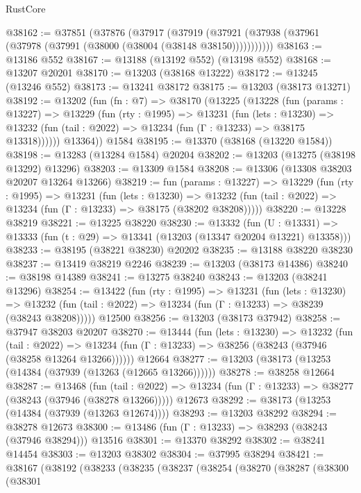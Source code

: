 \begin{lexlean}{RustCore}
\begin{coremodule}
@38162 := @37851
    (@37876
      (@37917
        (@37919 (@37921 (@37938 (@37961 (@37978 (@37991 (@38000 (@38004 (@38148 @38150)))))))))))
@38163 := @13186 @552
@38167 := @13188 (@13192 @552) (@13198 @552)
@38168 := @13207 @20201
@38170 := @13203 (@38168 @13222)
@38172 := @13245 (@13246 @552)
@38173 := @13241 @38172
@38175 := @13203 (@38173 @13271)
@38192 := @13202
    (fun (fn : @7) =>
    @38170
      (@13225
        (@13228
          (fun (params : @13227) =>
          @13229
            (fun (rty : @1995) =>
            @13231
              (fun (lets : @13230) =>
              @13232 (fun (tail : @2022) => @13234 (fun (Γ : @13233) => @38175 @13318))))))
        @13364))
    @1584
@38195 := @13370 (@38168 (@13220 @1584))
@38198 := @13283 (@13284 @1584) @20204
@38202 := @13203 (@13275 (@38198 @13292) @13296)
@38203 := @13309 @1584
@38208 := @13306 (@13308 @38203 @20207 @13264 @13266)
@38219 := fun (params : @13227) =>
  @13229
    (fun (rty : @1995) =>
    @13231
      (fun (lets : @13230) =>
      @13232 (fun (tail : @2022) => @13234 (fun (Γ : @13233) => @38175 (@38202 @38208)))))
@38220 := @13228 @38219
@38221 := @13225 @38220
@38230 := @13332
    (fun (U : @13331) => @13333 (fun (t : @29) => @13341 (@13203 (@13347 @20204 @13221) @13358)))
@38233 := @38195 (@38221 @38230) @20202
@38235 := @13188 @38220 @38230
@38237 := @13419 @38219 @2246
@38239 := @13203 (@38173 @14386)
@38240 := @38198 @14389
@38241 := @13275 @38240
@38243 := @13203 (@38241 @13296)
@38254 := @13422
    (fun (rty : @1995) =>
    @13231
      (fun (lets : @13230) =>
      @13232 (fun (tail : @2022) => @13234 (fun (Γ : @13233) => @38239 (@38243 @38208)))))
    @12500
@38256 := @13203 (@38173 @37942)
@38258 := @37947 @38203 @20207
@38270 := @13444
    (fun (lets : @13230) =>
    @13232
      (fun (tail : @2022) =>
      @13234 (fun (Γ : @13233) => @38256 (@38243 (@37946 (@38258 @13264 @13266))))))
    @12664
@38277 := @13203 (@38173 (@13253 (@14384 (@37939 (@13263 (@12665 @13266))))))
@38278 := @38258 @12664
@38287 := @13468
    (fun (tail : @2022) => @13234 (fun (Γ : @13233) => @38277 (@38243 (@37946 (@38278 @13266)))))
    @12673
@38292 := @38173 (@13253 (@14384 (@37939 (@13263 @12674))))
@38293 := @13203 @38292
@38294 := @38278 @12673
@38300 := @13486 (fun (Γ : @13233) => @38293 (@38243 (@37946 @38294))) @13516
@38301 := @13370 @38292
@38302 := @38241 @14454
@38303 := @13203 @38302
@38304 := @37995 @38294
@38421 := @38167
    (@38192
      (@38233
        (@38235
          (@38237
            (@38254
              (@38270
                (@38287
                  (@38300
                    (@38301

\end{coremodule}
\end{lexlean}
